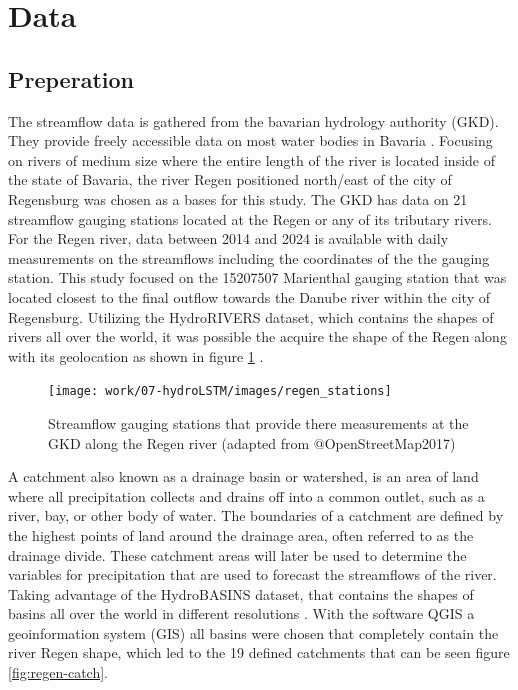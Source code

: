 \documentclass[
]{krantz}
\begin{document}
\section{Data}\label{data-2}

\subsection{Preperation}\label{preperation}

The streamflow data is gathered from the bavarian hydrology authority (GKD). They provide freely accessible data on most water bodies in Bavaria \citet{gkd2024}. Focusing on rivers of medium size where the entire length of the river is located inside of the state of Bavaria, the river Regen positioned north/east of the city of Regensburg was chosen as a bases for this study. The GKD has data on 21 streamflow gauging stations located at the Regen or any of its tributary rivers. For the Regen river, data between 2014 and 2024 is available with daily measurements on the streamflows including the coordinates of the the gauging station. This study focused on the 15207507 Marienthal gauging station that was located closest to the final outflow towards the Danube river within the city of Regensburg. Utilizing the HydroRIVERS dataset, which contains the shapes of rivers all over the world, it was possible the acquire the shape of the Regen along with its geolocation as shown in figure \ref{fig:regen-shape} \citet{lehner2008}.

\begin{figure}

{\centering \texttt{[image: work/07-hydroLSTM/images/regen\_stations]} 

}

\caption{Streamflow gauging stations that provide there measurements at the GKD along the Regen river (adapted from @OpenStreetMap2017)}\label{fig:regen-shape}
\end{figure}

A catchment also known as a drainage basin or watershed, is an area of land where all precipitation collects and drains off into a common outlet, such as a river, bay, or other body of water. The boundaries of a catchment are defined by the highest points of land around the drainage area, often referred to as the drainage divide. These catchment areas will later be used to determine the variables for precipitation that are used to forecast the streamflows of the river. Taking advantage of the HydroBASINS dataset, that contains the shapes of basins all over the world in different resolutions \citet{lehner2008}. With the software QGIS a geoinformation system (GIS) all basins were chosen that completely contain the river Regen shape, which led to the 19 defined catchments that can be seen figure \ref{fig:regen-catch}.
\end{document}
